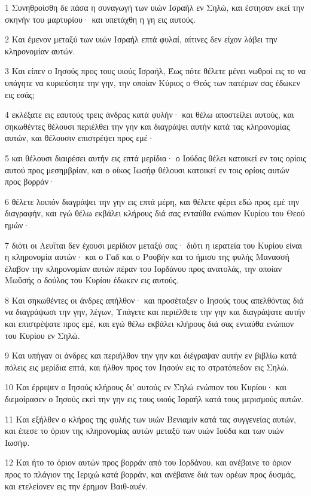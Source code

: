 \par 1 Συνηθροίσθη δε πάσα η συναγωγή των υιών Ισραήλ εν Σηλώ, και έστησαν εκεί την σκηνήν του μαρτυρίου· και υπετάχθη η γη εις αυτούς.
\par 2 Και έμενον μεταξύ των υιών Ισραήλ επτά φυλαί, αίτινες δεν είχον λάβει την κληρονομίαν αυτών.
\par 3 Και είπεν ο Ιησούς προς τους υιούς Ισραήλ, Έως πότε θέλετε μένει νωθροί εις το να υπάγητε να κυριεύσητε την γην, την οποίαν Κύριος ο Θεός των πατέρων σας έδωκεν εις εσάς;
\par 4 εκλέξατε εις εαυτούς τρεις άνδρας κατά φυλήν· και θέλω αποστείλει αυτούς, και σηκωθέντες θέλουσι περιέλθει την γην και διαγράψει αυτήν κατά τας κληρονομίας αυτών, και θέλουσιν επιστρέψει προς εμέ·
\par 5 και θέλουσι διαιρέσει αυτήν εις επτά μερίδια· ο Ιούδας θέλει κατοικεί εν τοις ορίοις αυτού προς μεσημβρίαν, και ο οίκος Ιωσήφ θέλουσι κατοικεί εν τοις ορίοις αυτών προς βορράν·
\par 6 θέλετε λοιπόν διαγράψει την γην εις επτά μέρη, και θέλετε φέρει εδώ προς εμέ την διαγραφήν, και εγώ θέλω εκβάλει κλήρους διά σας ενταύθα ενώπιον Κυρίου του Θεού ημών·
\par 7 διότι οι Λευΐται δεν έχουσι μερίδιον μεταξύ σας· διότι η ιερατεία του Κυρίου είναι η κληρονομία αυτών· και ο Γαδ και ο Ρουβήν και το ήμισυ της φυλής Μανασσή έλαβον την κληρονομίαν αυτών πέραν του Ιορδάνου προς ανατολάς, την οποίαν Μωϋσής ο δούλος του Κυρίου έδωκεν εις αυτούς.
\par 8 Και σηκωθέντες οι άνδρες απήλθον· και προσέταξεν ο Ιησούς τους απελθόντας διά να διαγράψωσι την γην, λέγων, Υπάγετε και περιέλθετε την γην και διαγράψατε αυτήν και επιστρέψατε προς εμέ, και εγώ θέλω εκβάλει κλήρους διά σας ενταύθα ενώπιον του Κυρίου εν Σηλώ.
\par 9 Και υπήγαν οι άνδρες και περιήλθον την γην και διέγραψαν αυτήν εν βιβλίω κατά πόλεις εις μερίδια επτά, και ήλθον προς τον Ιησούν εις το στρατόπεδον εις Σηλώ.
\par 10 Και έρριψεν ο Ιησούς κλήρους δι' αυτούς εν Σηλώ ενώπιον του Κυρίου· και διεμοίρασεν ο Ιησούς εκεί την γην εις τους υιούς Ισραήλ κατά τους μερισμούς αυτών.
\par 11 Και εξήλθεν ο κλήρος της φυλής των υιών Βενιαμίν κατά τας συγγενείας αυτών, και έπεσε το όριον της κληρονομίας αυτών μεταξύ των υιών Ιούδα και των υιών Ιωσήφ.
\par 12 Και ήτο το όριον αυτών προς βορράν από του Ιορδάνου, και ανέβαινε το όριον προς το πλάγιον της Ιεριχώ κατά βορράν, και ανέβαινε διά των ορέων προς δυσμάς, και ετελείονεν εις την έρημον Βαιθ-αυέν.
